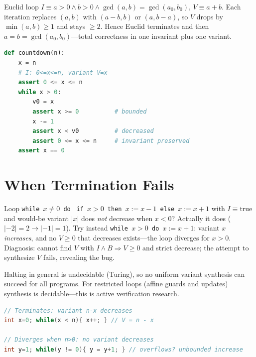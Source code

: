 \begin{example}
Euclid loop $I\equiv a>0\land b>0\land\gcd(a,b)=\gcd(a_0,b_0)$, $V\equiv a+b$. Each iteration replaces $(a,b)$ with $(a-b,b)$ or $(a,b-a)$, so $V$ drops by $\min(a,b)\ge1$ and stays $\ge2$. Hence Euclid terminates and then $a=b=\gcd(a_0,b_0)$—total correctness in one invariant plus one variant.
\end{example}

\begin{lstlisting}[language=Python, caption={Variant as runtime monitor: assert decrease and boundedness each lap.}, label={lst:variant-py}]
def countdown(n):
    x = n
    # I: 0<=x<=n, variant V=x
    assert 0 <= x <= n
    while x > 0:
        v0 = x
        assert x >= 0          # bounded
        x -= 1
        assert x < v0          # decreased
        assert 0 <= x <= n     # invariant preserved
    assert x == 0
\end{lstlisting}

\section{When Termination Fails}
\label{sec:nonterm}
Loop \texttt{while $x\neq0$ do } \texttt{if $x>0$ then $x:=x-1$ else $x:=x+1$} with $I\equiv\text{true}$ and would-be variant $|x|$ does \emph{not} decrease when $x<0$? Actually it does ($|{-2}|=2\to|{-1}|=1$). Try instead \texttt{while $x>0$ do $x:=x+1$}: variant $x$ \emph{increases}, and no $V\ge0$ that decreases exists—the loop diverges for $x>0$. Diagnosis: cannot find $V$ with $I\land B\Rightarrow V\ge0$ and strict decrease; the attempt to synthesize $V$ fails, revealing the bug.

Halting in general is undecidable (Turing), so no uniform variant synthesis can succeed for all programs. For restricted loops (affine guards and updates) synthesis is decidable—this is active verification research.

\begin{lstlisting}[language=C, caption={A terminating and a non-terminating loop: only one admits a variant.}, label={lst:term-c}]
// Terminates: variant n-x decreases
int x=0; while(x < n){ x++; } // V = n - x

// Diverges when n>0: no variant decreases
int y=1; while(y != 0){ y = y+1; } // overflows? unbounded increase
\end{lstlisting}

